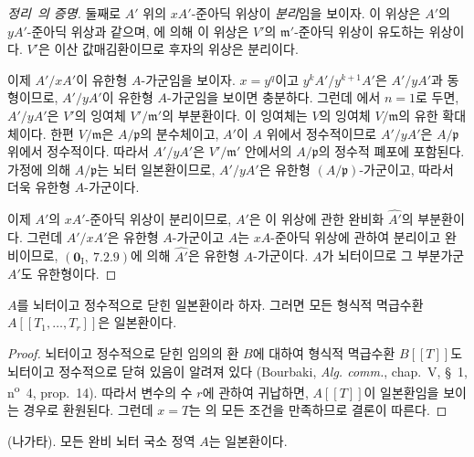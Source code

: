 \begin{proof}[정리~{\rm{}}의 증명]
둘째로 $A'$ 위의 $xA'$-준아딕 위상이 \emph{분리}임을 보이자. 이
위상은 $A'$의 $yA'$-준아딕 위상과 같으며,
에 의해 이 위상은 $V'$의
$\mathfrak m'$-준아딕 위상이 유도하는 위상이다. $V'$은 이산
값매김환이므로 후자의 위상은 분리이다.

이제 $A'/xA'$이 유한형 $A$-가군임을 보이자. $x=y^q$이고
$y^kA'/y^{k+1}A'$은 $A'/yA'$과 동형이므로, $A'/yA'$이 유한형
$A$-가군임을 보이면 충분하다. 그런데
에서 $n=1$로 두면, $A'/yA'$은 $V'$의 잉여체
$V'/\mathfrak m'$의 부분환이다. 이 잉여체는 $V$의 잉여체
$V/\mathfrak m$의 유한 확대체이다. 한편 $V/\mathfrak m$은
$A/\mathfrak p$의 분수체이고, $A'$이 $A$ 위에서 정수적이므로
$A'/yA'$은 $A/\mathfrak p$ 위에서 정수적이다. 따라서
$A'/yA'$은 $V'/\mathfrak m'$ 안에서의 $A/\mathfrak p$의 정수적
폐포에 포함된다. 가정에 의해 $A/\mathfrak p$는 뇌터 일본환이므로,
$A'/yA'$은 유한형 $(A/\mathfrak p)$-가군이고, 따라서 더욱 유한형
$A$-가군이다.

이제 $A'$의 $xA'$-준아딕 위상이 분리이므로, $A'$은 이 위상에 관한
완비화 $\widehat{A'}$의 부분환이다. 그런데 $A'/xA'$은 유한형
$A$-가군이고 $A$는 $xA$-준아딕 위상에 관하여 분리이고 완비이므로,
$(\mathbf 0_{\mathrm I},~7.2.9)$에 의해 $\widehat{A'}$은 유한형
$A$-가군이다. $A$가 뇌터이므로 그 부분가군 $A'$도 유한형이다.
\end{proof}

\begin{corollary}[23.1.4]
\label{0.23.1.4-ko}
$A$를 뇌터이고 정수적으로 닫힌 일본환이라 하자. 그러면 모든 형식적
멱급수환 $A[[T_1,\ldots,T_r]]$은 일본환이다.
\end{corollary}

\begin{proof}
뇌터이고 정수적으로 닫힌 임의의 환 $B$에 대하여 형식적 멱급수환
$B[[T]]$도 뇌터이고 정수적으로 닫혀 있음이 알려져 있다
(Bourbaki, \emph{Alg. comm.}, chap.~V, §~1,
n\textsuperscript{o}~4, prop.~14). 따라서 변수의 수 $r$에 관하여
귀납하면, $A[[T]]$이 일본환임을 보이는 경우로 환원된다. 그런데
$x=T$는 의 모든 조건을 만족하므로 결론이 따른다.
\end{proof}

\begin{theorem}[23.1.5]
\label{0.23.1.5-ko}
\textnormal{(나가타).} 모든 완비 뇌터 국소 정역 $A$는 일본환이다.
\end{theorem}

